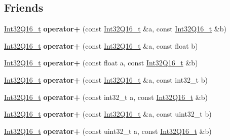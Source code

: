 \subsection*{Friends}
\begin{DoxyCompactItemize}
\item 
\hypertarget{class_int32_q16__t_a1e131f58c17190e69fdb026a1f889c44}{}\hyperlink{class_int32_q16__t}{Int32\+Q16\+\_\+t} {\bfseries operator+} (const \hyperlink{class_int32_q16__t}{Int32\+Q16\+\_\+t} \&a, const \hyperlink{class_int32_q16__t}{Int32\+Q16\+\_\+t} \&b)\label{class_int32_q16__t_a1e131f58c17190e69fdb026a1f889c44}

\item 
\hypertarget{class_int32_q16__t_a73ea61469875dc24ee2b53c31e434a78}{}\hyperlink{class_int32_q16__t}{Int32\+Q16\+\_\+t} {\bfseries operator+} (const \hyperlink{class_int32_q16__t}{Int32\+Q16\+\_\+t} \&a, const float b)\label{class_int32_q16__t_a73ea61469875dc24ee2b53c31e434a78}

\item 
\hypertarget{class_int32_q16__t_aa7eda7ae6aabdf92be178531f04400a2}{}\hyperlink{class_int32_q16__t}{Int32\+Q16\+\_\+t} {\bfseries operator+} (const float a, const \hyperlink{class_int32_q16__t}{Int32\+Q16\+\_\+t} \&b)\label{class_int32_q16__t_aa7eda7ae6aabdf92be178531f04400a2}

\item 
\hypertarget{class_int32_q16__t_a60655abae3d4520c56e4807fe8e965ce}{}\hyperlink{class_int32_q16__t}{Int32\+Q16\+\_\+t} {\bfseries operator+} (const \hyperlink{class_int32_q16__t}{Int32\+Q16\+\_\+t} \&a, const int32\+\_\+t b)\label{class_int32_q16__t_a60655abae3d4520c56e4807fe8e965ce}

\item 
\hypertarget{class_int32_q16__t_a438f917fac674f94bd51b3e5ca88249c}{}\hyperlink{class_int32_q16__t}{Int32\+Q16\+\_\+t} {\bfseries operator+} (const int32\+\_\+t a, const \hyperlink{class_int32_q16__t}{Int32\+Q16\+\_\+t} \&b)\label{class_int32_q16__t_a438f917fac674f94bd51b3e5ca88249c}

\item 
\hypertarget{class_int32_q16__t_ae76c41112af98d2b2f32ace5fd74793e}{}\hyperlink{class_int32_q16__t}{Int32\+Q16\+\_\+t} {\bfseries operator+} (const \hyperlink{class_int32_q16__t}{Int32\+Q16\+\_\+t} \&a, const uint32\+\_\+t b)\label{class_int32_q16__t_ae76c41112af98d2b2f32ace5fd74793e}

\item 
\hypertarget{class_int32_q16__t_a4f5167b2f485db616a508d5e3235a4e9}{}\hyperlink{class_int32_q16__t}{Int32\+Q16\+\_\+t} {\bfseries operator+} (const uint32\+\_\+t a, const \hyperlink{class_int32_q16__t}{Int32\+Q16\+\_\+t} \&b)\label{class_int32_q16__t_a4f5167b2f485db616a508d5e3235a4e9}


\end{DoxyCompactItemize}
